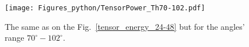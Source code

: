     \begin{figure}[h]
        \begin{center}
        \texttt{[image: Figures\_python/TensorPower\_Th70-102.pdf]}
        \end{center}
        \caption{The same as on the Fig.~\ref*{tensor_energy_24-48} but
        for the angles' range $70^{\circ} - 102^{\circ}$.}
        \label{tensor_energy_70-102}
    \end{figure}
        
